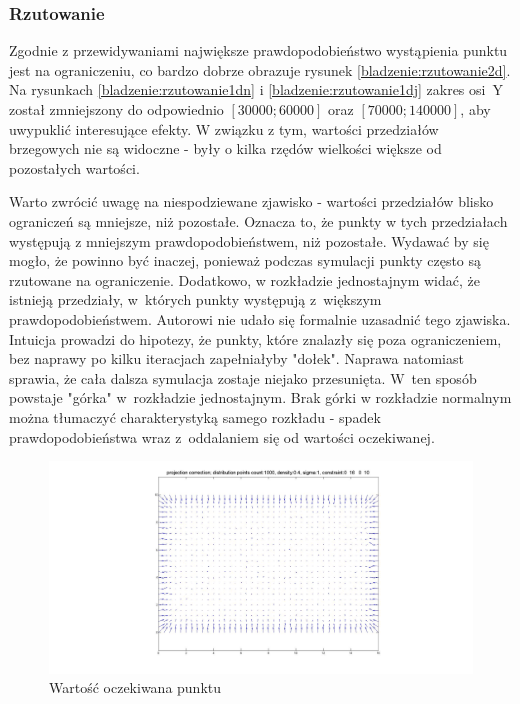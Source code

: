 \documentclass{mini}
\begin{document}
\subsubsection*{Rzutowanie}
Zgodnie z przewidywaniami największe prawdopodobieństwo wystąpienia punktu jest na ograniczeniu, co bardzo dobrze obrazuje rysunek \ref{bladzenie:rzutowanie2d}. Na rysunkach \ref{bladzenie:rzutowanie1dn} i \ref{bladzenie:rzutowanie1dj} zakres osi~Y został zmniejszony do odpowiednio $[30000;60000]$ oraz $[70000;140000]$, aby uwypuklić interesujące efekty. W związku z tym, wartości przedziałów brzegowych nie są widoczne - były o kilka rzędów wielkości większe od pozostałych wartości.

Warto zwrócić uwagę na niespodziewane zjawisko - wartości przedziałów blisko ograniczeń są mniejsze, niż pozostałe. Oznacza to, że punkty w tych przedziałach występują z mniejszym prawdopodobieństwem, niż pozostałe. Wydawać by się mogło, że powinno być inaczej, ponieważ podczas symulacji punkty często są rzutowane na ograniczenie. Dodatkowo, w rozkładzie jednostajnym widać, że istnieją przedziały, w~których punkty występują z~większym prawdopodobieństwem. Autorowi nie udało się formalnie uzasadnić tego zjawiska. Intuicja prowadzi do hipotezy, że punkty, które znalazły się poza ograniczeniem, bez naprawy po kilku iteracjach zapełniałyby "dołek". Naprawa natomiast sprawia, że cała dalsza symulacja zostaje niejako przesunięta. W~ten sposób powstaje "górka" w~rozkładzie jednostajnym. Brak górki w rozkładzie normalnym można tłumaczyć charakterystyką samego rozkładu - spadek prawdopodobieństwa wraz z~oddalaniem się od wartości oczekiwanej.

\begin{figure}[H]
\centering
\includegraphics[width=\textwidth]{projection2dprzesuniecie}
\caption{Wartość oczekiwana punktu}
\end{figure}
\end{document}
